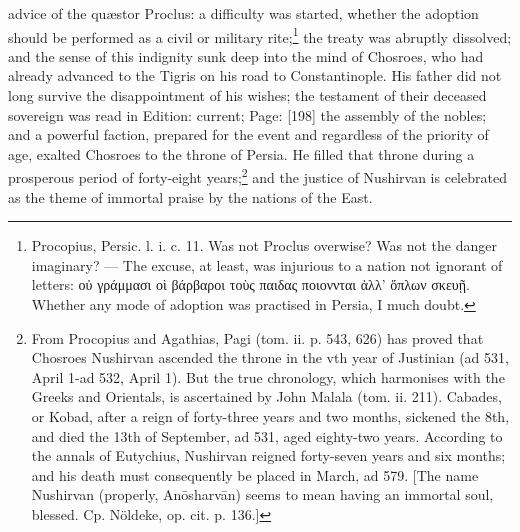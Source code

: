 advice of the quæstor Proclus: a difficulty was started, whether the adoption should be performed as a civil or military rite;\footnote{Procopius, Persic. l. i. c. 11. Was not Proclus overwise? Was not the danger imaginary? \texthebrew{—} The excuse, at least, was injurious to a nation not ignorant of letters: \textgreek{ο\texthebrew{ὐ} γράμμασι ο\texthebrew{ὶ} βάρβαροι το\texthebrew{ὺ}ς παιδας ποιοννται \texthebrew{ἀ}λλ\texthebrew{’ ὅ}πλων σκευ\texthebrew{ῇ}}. Whether any mode of adoption was practised in Persia, I much doubt.} the treaty was abruptly dissolved; and the sense of this indignity sunk deep into the mind of Chosroes, who had already advanced to the Tigris on his road to Constantinople. His father did not long survive the disappointment of his wishes; the testament of their deceased sovereign was read in Edition: current; Page: [198] the assembly of the nobles; and a powerful faction, prepared for the event and regardless of the priority of age, exalted Chosroes to the throne of Persia. He filled that throne during a prosperous period of forty-eight years;\footnote{From Procopius and Agathias, Pagi (tom. ii. p. 543, 626) has proved that Chosroes Nushirvan ascended the throne in the vth year of Justinian (ad 531, April 1-ad 532, April 1). But the true chronology, which harmonises with the Greeks and Orientals, is ascertained by John Malala (tom. ii. 211). Cabades, or Kobad, after a reign of forty-three years and two months, sickened the 8th, and died the 13th of September, ad 531, aged eighty-two years. According to the annals of Eutychius, Nushirvan reigned forty-seven years and six months; and his death must consequently be placed in March, ad 579. [The name Nushirvan (properly, Anōsharvān) seems to mean having an immortal soul, blessed. Cp. Nöldeke, op. cit. p. 136.]} and the justice of Nushirvan is celebrated as the theme of immortal praise by the nations of the East.

